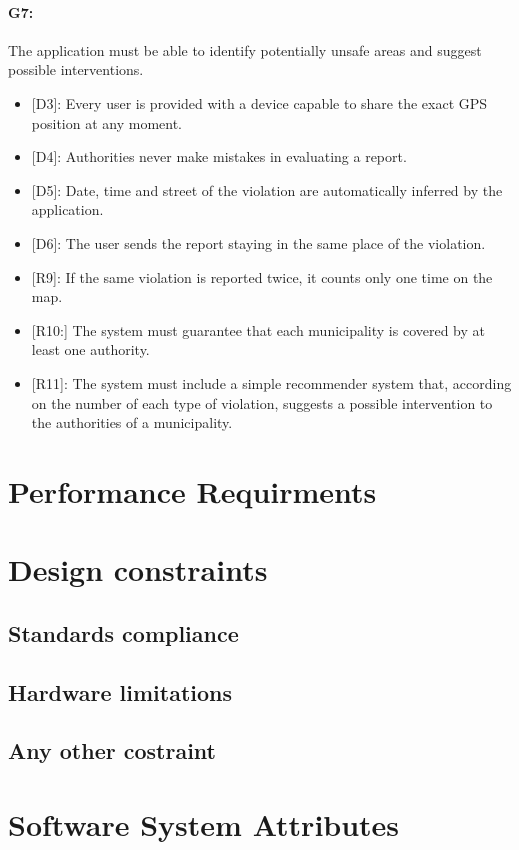 \documentclass[12pt,a4paper]{report}
\begin{document}
			\paragraph {G7:} The application must be able to identify potentially unsafe areas and suggest possible interventions.
				\begin{itemize}
					\item{[D3]:} Every user is provided with a device capable to share the exact GPS position at any moment.
			 		\item{[D4]:} Authorities never make mistakes in evaluating a report.
					\item{[D5]:} Date, time and street of the violation are automatically inferred by the application.
			 		\item{[D6]:} The user sends the report staying in the same place of the violation.
				\end{itemize}
				\begin{itemize}
					\item{[R9]:} If the same violation is reported twice, it counts only one time on the map.
					\item{[R10:]} The system must guarantee that each municipality is covered by at least one authority.
					\item{[R11]:} The system must include a simple recommender system that, according on the number of each type of violation, suggests a possible intervention to the authorities of a municipality.
				\end{itemize}
	
	\section{Performance Requirments}
	\section{Design constraints}
		\subsection{Standards compliance}
		\subsection{Hardware limitations}
		\subsection{Any other costraint}
	\section{Software System Attributes}
\end{document}
